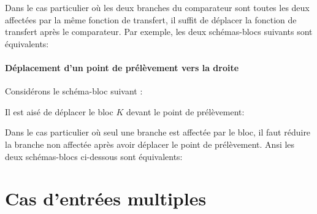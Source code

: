 Dans le cas particulier où les deux branches du comparateur sont toutes 
les deux affectées par la même fonction de transfert, il suffit de déplacer 
la fonction de transfert après le comparateur. Par exemple, les deux 
schémas-blocs suivants sont équivalents: 

\begin{center}
    
\end{center}

\paragraph{Déplacement d'un point de prélèvement vers la droite}

Considérons le schéma-bloc suivant :
\begin{center}
    
\end{center}
Il est aisé de déplacer le bloc $K$ devant le point de prélèvement:  
\begin{center}
    
\end{center}

Dans le cas particulier où seul une branche est affectée par le bloc, 
il faut réduire la branche non affectée après avoir déplacer le point 
de prélèvement. Ansi les deux schémas-blocs ci-dessous sont équivalents:

\begin{center}
    
\end{center}

\section{Cas d'entrées multiples\label{sec-bloc_multE}}


